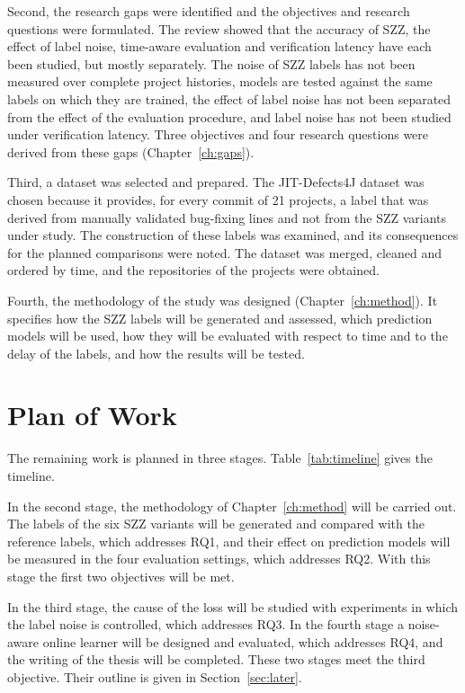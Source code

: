 \documentclass[12pt,a4paper,oneside]{report}
\begin{document}
Second, the research gaps were identified and the objectives and research
questions were formulated. The review showed that the accuracy of SZZ, the
effect of label noise, time-aware evaluation and verification latency have
each been studied, but mostly separately. The noise of SZZ labels has not been
measured over complete project histories, models are tested against the same
labels on which they are trained, the effect of label noise has not been
separated from the effect of the evaluation procedure, and label noise has
not been studied under verification latency. Three objectives and four
research questions were derived from these gaps (Chapter~\ref{ch:gaps}).

Third, a dataset was selected and prepared. The JIT-Defects4J dataset was
chosen because it provides, for every commit of 21 projects, a label that was
derived from manually validated bug-fixing lines and not from the SZZ variants
under study. The construction of these labels was examined, and its
consequences for the planned comparisons were noted. The dataset was merged,
cleaned and ordered by time, and the repositories of the projects were
obtained.

Fourth, the methodology of the study was designed
(Chapter~\ref{ch:method}). It specifies how the SZZ labels will be generated
and assessed, which prediction models will be used, how they will be
evaluated with respect to time and to the delay of the labels, and how the
results will be tested.

\section{Plan of Work}\label{sec:plan}

The remaining work is planned in three stages. Table~\ref{tab:timeline}
gives the timeline.

In the second stage, the methodology of Chapter~\ref{ch:method} will be
carried out. The labels of the six SZZ variants will be generated and
compared with the reference labels, which addresses RQ1, and their effect on
prediction models will be measured in the four evaluation settings, which
addresses RQ2. With this stage the first two objectives will be met.

In the third stage, the cause of the loss will be studied with experiments in
which the label noise is controlled, which addresses RQ3. In the fourth stage
a noise-aware online learner will be designed and evaluated, which addresses
RQ4, and the writing of the thesis will be completed. These two stages meet
the third objective. Their outline is given in Section~\ref{sec:later}.
\end{document}
